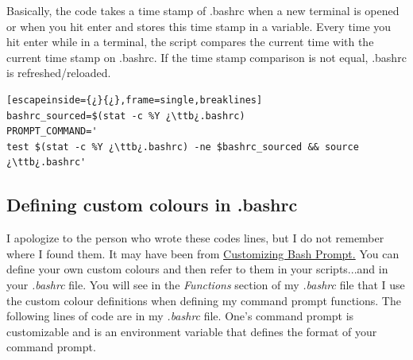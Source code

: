 Basically, the code takes a time stamp of \ttb{}.bashrc when a new terminal is opened or when you hit enter and stores this time stamp in a variable. Every time you hit enter while in a terminal, the script compares the current time with the current time stamp on \ttb{}.bashrc. If the time stamp comparison is not equal, \ttb{}.bashrc is refreshed/reloaded.

\begin{lstlisting}[escapeinside={¿}{¿},frame=single,breaklines]
bashrc_sourced=$(stat -c %Y ¿\ttb¿.bashrc)
PROMPT_COMMAND='
test $(stat -c %Y ¿\ttb¿.bashrc) -ne $bashrc_sourced && source ¿\ttb¿.bashrc'
\end{lstlisting}

\subsection{Defining custom colours in \ttb{}.bashrc}\label{sec:customcolours}

I apologize to the person who wrote these codes lines, but I do not remember where I found them. It may have been from \href{https://help.ubuntu.com/community/CustomizingBashPrompt}{Customizing Bash Prompt.} You can define your own custom colours and then refer to them in your scripts...and in your \textsl{.bashrc} file. You will see in the \emph{Functions} section of my \textsl{.bashrc} file that I use the custom colour definitions when defining my command prompt functions. The following lines of code are in my \textsl{.bashrc} file. One's command prompt is customizable and  is an environment variable that defines the format of your command prompt.

